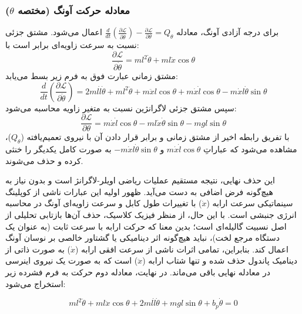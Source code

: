 \subsubsection{معادله حرکت آونگ (مختصه $\theta$)}
برای درجه آزادی آونگ، معادله $\frac{d}{dt}\left(\frac{\partial \mathcal{L}}{\partial \dot{\theta}}\right) - \frac{\partial \mathcal{L}}{\partial \theta} = Q_\theta$ اعمال می‌شود. مشتق جزئی نسبت به سرعت زاویه‌ای برابر است با:
\begin{equation}
    \frac{\partial \mathcal{L}}{\partial \dot{\theta}} = ml^2\dot{\theta} + ml\dot{x}\cos\theta
\end{equation}
مشتق زمانی عبارت فوق به فرم زیر بسط می‌یابد:
\begin{equation}
    \frac{d}{dt}\left(\frac{\partial \mathcal{L}}{\partial \dot{\theta}}\right) = 2ml\dot{l}\dot{\theta} + ml^2\ddot{\theta} + m\ddot{x}l\cos\theta + m\dot{x}\dot{l}\cos\theta - m\dot{x}l\dot{\theta}\sin\theta
\end{equation}
سپس مشتق جزئی لاگرانژین نسبت به متغیر زاویه محاسبه می‌شود:
\begin{equation}
    \frac{\partial \mathcal{L}}{\partial \theta} = m\dot{x}\dot{l}\cos\theta - ml\dot{x}\dot{\theta}\sin\theta - mgl\sin\theta
\end{equation}
با تفریق رابطه اخیر از مشتق زمانی و برابر قرار دادن آن با نیروی تعمیم‌یافته ($Q_\theta$)، مشاهده می‌شود که عباراتِ $m\dot{x}\dot{l}\cos\theta$ و $-m\dot{x}l\dot{\theta}\sin\theta$ به صورت کامل یکدیگر را خنثی کرده و حذف می‌شوند.

این حذف نهایی، نتیجه مستقیم عملیات ریاضی اویلر-لاگرانژ است و بدون نیاز به هیچ‌گونه فرض اضافی به دست می‌آید. ظهور اولیه این عبارات ناشی از کوپلینگ سینماتیکی سرعت ارابه ($\dot{x}$) با تغییرات طول کابل و سرعت زاویه‌ای آونگ در محاسبه انرژی جنبشی است. با این حال، از منظر فیزیک کلاسیک، حذف آن‌ها بازتابی تحلیلی از اصل نسبیت گالیله‌ای است؛ بدین معنا که حرکت ارابه با سرعت ثابت (به عنوان یک دستگاه مرجع لخت)، نباید هیچ‌گونه اثر دینامیکی یا گشتاور خالصی بر نوسان آونگ اعمال کند. بنابراین، تمامی اثرات ناشی از سرعت افقی ارابه ($\dot{x}$) به صورت ذاتی از دینامیک پاندول حذف شده و تنها شتاب ارابه ($\ddot{x}$) است که به صورت یک نیروی اینرسی در معادله نهایی باقی می‌ماند. در نهایت، معادله دوم حرکت به فرم فشرده زیر استخراج می‌شود:

\begin{equation}
    ml^2\ddot{\theta} + ml\ddot{x}\cos\theta + 2ml\dot{l}\dot{\theta} + mgl\sin\theta + b_p\dot{\theta} = 0
\end{equation}

